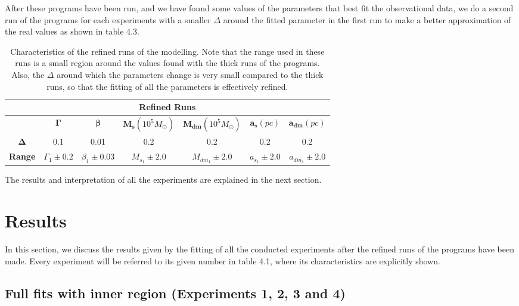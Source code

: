 After these programs have been run, and we have found some values of the parameters that best fit the observational data, we do a second run of the programs for each experiments with a smaller $\Delta$ around the fitted parameter in the first run to make a better approximation of the real values as shown in table 4.3.

\begin{table}[H]
\centering
\label{my-label}
\begin{tabular}{|c|c|c|c|c|c|c|}
\hline
\multicolumn{7}{|c|}{\textbf{Refined Runs}}                                                                          \\ \hline
               & \textbf{$\mathbf{\Gamma}$} & \textbf{$\mathbf{\beta}$} & \textbf{$\mathbf{M_{s}}(10^{5} M_{\odot})$} & \textbf{$\mathbf{M_{dm}}(10^{5} M_{\odot})$} & \textbf{$\mathbf{a_{s}}(pc)$} & \textbf{$\mathbf{a_{dm}}(pc)$} \\ \hline
\textbf{$\mathbf{\Delta}$}  &  0.1 &  0.01     &  0.2    &  0.2   &  0.2    &  0.2          \\ \hline
\textbf{Range} & $\Gamma_{1}\pm 0.2$   & $\beta_{1}\pm 0.03$        & $M_{s}_{1}\pm 2.0$      & $M_{dm}_{1}\pm 2.0$   & $a_{s}_{1}\pm 2.0$      & $a_{dm}_{1}\pm 2.0$            \\ \hline
\end{tabular}
\caption[Characteristics of the refined runs of the modelling]{Characteristics of the refined runs of the modelling. Note that the range used in these runs is a small region around the values found with the thick runs of the programs. Also, the $\Delta$ around which the parameters change is very small compared to the thick runs, so that the fitting of all the parameters is effectively refined.}
\end{table}

The results and interpretation of all the experiments are explained in the next section.

\section{Results}

In this section, we discuss the results given by the fitting of all the conducted experiments after the refined runs of the programs have been made. Every experiment will be referred to its given number in table 4.1, where its characteristics are explicitly shown.

\subsection{Full fits with inner region (Experiments 1, 2, 3 and 4)}

